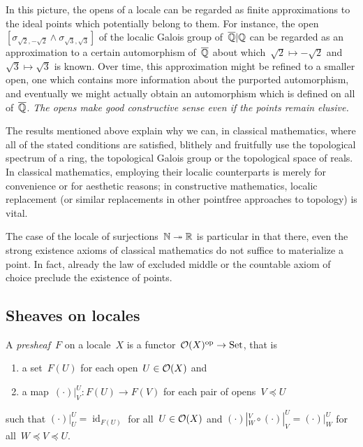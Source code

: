 \documentclass{ws-rv9x6}
\begin{document}
{In this picture, the opens of a locale can be regarded as finite approximations
to the ideal points which potentially belong to them. For instance, the
open~$[\sigma_{\sqrt{2},-\sqrt{2}} \wedge \sigma_{\sqrt{3},\sqrt{3}}]$
of the localic Galois group of~$\overline{\mathbb{Q}}|\mathbb{Q}$ can be regarded as an
approximation to a certain automorphism of~$\overline{\mathbb{Q}}$ about
which~$\sqrt{2} \mapsto -\sqrt{2}$ and~$\sqrt{3} \mapsto \sqrt{3}$ is known. Over time, this
approximation might be refined to a smaller open, one which contains more
information about the purported automorphism, and eventually we might actually
obtain an automorphism which is defined on all of~$\overline{\mathbb{Q}}$. \emph{The opens
make good constructive sense even if the points remain elusive.}

The results mentioned above explain why we can, in classical mathematics, where all of the stated
conditions are satisfied, blithely and fruitfully use the topological
spectrum of a ring, the topological Galois group or the topological space of
reals. In classical mathematics, employing their localic counterparts is merely
for convenience or for aesthetic reasons; in constructive mathematics,
localic replacement (or similar replacements in other pointfree approaches to
topology) is vital.

\begin{remark}The case of the locale of surjections~$\mathbb{N} \twoheadrightarrow
\mathbb{R}$ is particular in that there, even the strong existence axioms of
classical mathematics do not suffice to materialize a point. In fact, already
the law of excluded middle or the countable axiom of choice preclude the
existence of points.
\end{remark}


\subsection{Sheaves on locales}
\label{sect:sheaves}

\begin{definition}\label{defn:presheaf}
A \emph{presheaf}~$F$ on a locale~$X$ is a functor~$\mathcal{O}(X)^{\mathrm{op}} \to \mathrm{Set}$, that is
\begin{enumerate}
  \item a set~$F(U)$ for each open~$U \in \mathcal{O}(X)$ and
  \item a map~$(\cdot)|^U_V : F(U) \to F(V)$ for each pair of opens~$V \preceq U$
\end{enumerate}
such that $(\cdot)|^U_U = \operatorname{id}_{F(U)}$ for all~$U \in \mathcal{O}(X)$ and
$(\cdot)|^V_W \circ (\cdot)|^U_V = (\cdot)|^U_W$ for all~$W \preceq V
\preceq U$.\end{definition}

}
\end{document}
